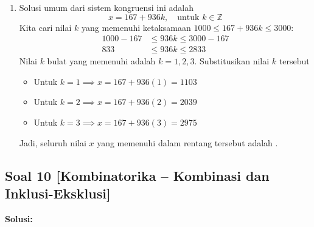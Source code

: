 \documentclass[12pt,a4paper]{article}
\begin{document}
\begin{enumerate}[label=(\alph*)]
\begin{itemize}
        \item Solusi $x$ didapatkan sebagai berikut
        \begin{align*}
            x &\equiv (a_1 M_1 y_1 + a_2 M_2 y_2 + a_3 M_3 y_3) \pmod M \\
            x &\equiv (7 \cdot 117 \cdot 5 + 5 \cdot 104 \cdot 2 + 11 \cdot 72 \cdot 2) \pmod{936} \\
            x &\equiv (4095 + 1040 + 1584) \pmod{936} \\
            x &\equiv 6719 \pmod{936} \\
            x &\equiv 167 \pmod{936}
        \end{align*}
    \end{itemize}
    Jadi, nilai bulat positif terkecil $x$ yang memenuhi adalah .

    \item Solusi umum dari sistem kongruensi ini adalah
    \[ x = 167 + 936k, \quad \text{untuk } k \in \mathbb{Z} \]
    Kita cari nilai $k$ yang memenuhi ketaksamaan $1000 \leq 167 + 936k \leq 3000$:
    \begin{align*}
        1000 - 167 &\leq 936k \leq 3000 - 167 \\
        833 &\leq 936k \leq 2833
    \end{align*}
    Nilai $k$ bulat yang memenuhi adalah $k = 1, 2, 3$.
    Substitusikan nilai $k$ tersebut
    \begin{itemize}
        \item Untuk $k = 1 \implies x = 167 + 936(1) = 1103$
        \item Untuk $k = 2 \implies x = 167 + 936(2) = 2039$
        \item Untuk $k = 3 \implies x = 167 + 936(3) = 2975$
    \end{itemize}
    Jadi, seluruh nilai $x$ yang memenuhi dalam rentang tersebut adalah .
\end{enumerate}

\subsection*{Soal 10 [Kombinatorika -- Kombinasi dan Inklusi-Eksklusi]}
\textbf{Solusi:}
\end{document}
